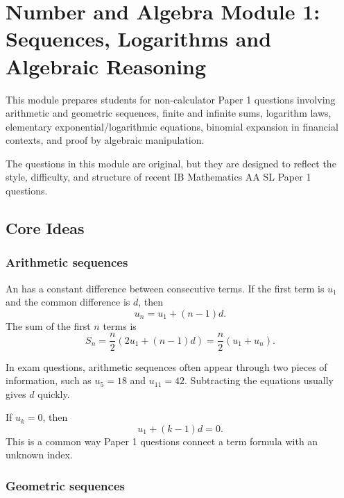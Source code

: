 
\chapter{Number and Algebra Module 1: Sequences, Logarithms and Algebraic Reasoning}

\begin{syllabusbox}
This module prepares students for non-calculator Paper 1 questions involving arithmetic and geometric sequences, finite and infinite sums, logarithm laws, elementary exponential/logarithmic equations, binomial expansion in financial contexts, and proof by algebraic manipulation.

The questions in this module are original, but they are designed to reflect the style, difficulty, and structure of recent IB Mathematics AA SL Paper 1 questions.
\end{syllabusbox}

\section{Core Ideas}

\subsection{Arithmetic sequences}

\begin{skillbox}
An  has a constant difference between consecutive terms. If the first term is $u_1$ and the common difference is $d$, then
\[
    u_n = u_1 + (n-1)d.
\]
The sum of the first $n$ terms is
\[
    S_n = \frac{n}{2}\left(2u_1+(n-1)d\right)
        = \frac{n}{2}(u_1+u_n).
\]
\end{skillbox}

\begin{examtipbox}
In exam questions, arithmetic sequences often appear through two pieces of information, such as $u_5=18$ and $u_{11}=42$. Subtracting the equations usually gives $d$ quickly.
\end{examtipbox}

\begin{notebox}
If $u_k=0$, then
\[
    u_1+(k-1)d=0.
\]
This is a common way Paper 1 questions connect a term formula with an unknown index.
\end{notebox}

\subsection{Geometric sequences}


